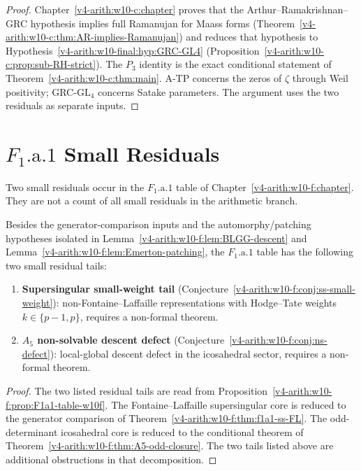 \begin{proof}
Chapter~\ref{v4-arith:w10-c:chapter} proves that the
Arthur--Ramakrishnan--GRC hypothesis implies full Ramanujan for Maass forms
(Theorem~\ref{v4-arith:w10-c:thm:AR-implies-Ramanujan}) and reduces that
hypothesis to Hypothesis~\ref{v4-arith:w10-final:hyp:GRC-GL4}
(Proposition~\ref{v4-arith:w10-c:prop:sub-RH-strict}). The \(P_{3}\) identity
is the exact conditional statement of Theorem~\ref{v4-arith:w10-c:thm:main}.
A-TP concerns the zeros of \(\zeta\) through Weil positivity;
GRC-\(\mathrm{GL}_{4}\) concerns Satake parameters.  The argument uses
the two residuals as separate inputs.
\end{proof}

\section{\(F_{1}\text{.a.1}\) Small Residuals}
\label{v4-arith:w10-final:tier3}

Two small residuals occur in the \(F_{1}\text{.a.1}\) table of
Chapter~\ref{v4-arith:w10-f:chapter}. They are not a count of all
small residuals in the arithmetic branch.

\begin{proposition}
\label{v4-arith:w10-final:prop:small-residuals}
\ClaimStatusProvedHere Besides the generator-comparison inputs and the
automorphy/patching hypotheses isolated in
Lemma~\ref{v4-arith:w10-f:lem:BLGG-descent} and
Lemma~\ref{v4-arith:w10-f:lem:Emerton-patching},
the \(F_{1}\text{.a.1}\) table has the following two small residual tails:
\begin{enumerate}
\item \textbf{Supersingular small-weight tail}
(Conjecture~\ref{v4-arith:w10-f:conj:ss-small-weight}): non-Fontaine--Laffaille
representations with Hodge--Tate weights
\(k \in \{p-1, p\}\), requires a non-formal theorem.
\item \textbf{\(A_{5}\) non-solvable descent defect}
(Conjecture~\ref{v4-arith:w10-f:conj:ns-defect}): local-global descent defect
in the icosahedral sector, requires a non-formal theorem.
\end{enumerate}
\end{proposition}

\begin{proof}
The two listed residual tails are read from
Proposition~\ref{v4-arith:w10-f:prop:F1a1-table-w10f}. The Fontaine--Laffaille
supersingular core is reduced to the generator comparison of
Theorem~\ref{v4-arith:w10-f:thm:f1a1-ss-FL}. The odd-determinant icosahedral
core is reduced to the conditional theorem of
Theorem~\ref{v4-arith:w10-f:thm:A5-odd-closure}. The two tails listed above are
additional obstructions in that decomposition.
\end{proof}

